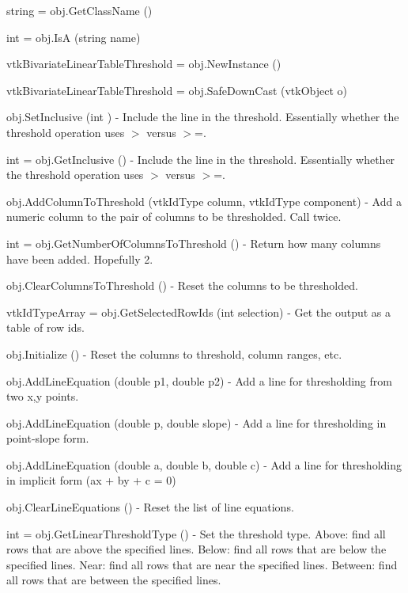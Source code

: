 \begin{DoxyItemize}
\item {\ttfamily string = obj.\-Get\-Class\-Name ()}  
\item {\ttfamily int = obj.\-Is\-A (string name)}  
\item {\ttfamily vtk\-Bivariate\-Linear\-Table\-Threshold = obj.\-New\-Instance ()}  
\item {\ttfamily vtk\-Bivariate\-Linear\-Table\-Threshold = obj.\-Safe\-Down\-Cast (vtk\-Object o)}  
\item {\ttfamily obj.\-Set\-Inclusive (int )} -\/ Include the line in the threshold. Essentially whether the threshold operation uses $>$ versus $>$=.  
\item {\ttfamily int = obj.\-Get\-Inclusive ()} -\/ Include the line in the threshold. Essentially whether the threshold operation uses $>$ versus $>$=.  
\item {\ttfamily obj.\-Add\-Column\-To\-Threshold (vtk\-Id\-Type column, vtk\-Id\-Type component)} -\/ Add a numeric column to the pair of columns to be thresholded. Call twice.  
\item {\ttfamily int = obj.\-Get\-Number\-Of\-Columns\-To\-Threshold ()} -\/ Return how many columns have been added. Hopefully 2.  
\item {\ttfamily obj.\-Clear\-Columns\-To\-Threshold ()} -\/ Reset the columns to be thresholded.  
\item {\ttfamily vtk\-Id\-Type\-Array = obj.\-Get\-Selected\-Row\-Ids (int selection)} -\/ Get the output as a table of row ids.  
\item {\ttfamily obj.\-Initialize ()} -\/ Reset the columns to threshold, column ranges, etc.  
\item {\ttfamily obj.\-Add\-Line\-Equation (double p1, double p2)} -\/ Add a line for thresholding from two x,y points.  
\item {\ttfamily obj.\-Add\-Line\-Equation (double p, double slope)} -\/ Add a line for thresholding in point-\/slope form.  
\item {\ttfamily obj.\-Add\-Line\-Equation (double a, double b, double c)} -\/ Add a line for thresholding in implicit form (ax + by + c = 0)  
\item {\ttfamily obj.\-Clear\-Line\-Equations ()} -\/ Reset the list of line equations.  
\item {\ttfamily int = obj.\-Get\-Linear\-Threshold\-Type ()} -\/ Set the threshold type. Above\-: find all rows that are above the specified lines. Below\-: find all rows that are below the specified lines. Near\-: find all rows that are near the specified lines. Between\-: find all rows that are between the specified lines.  

\end{DoxyItemize}
